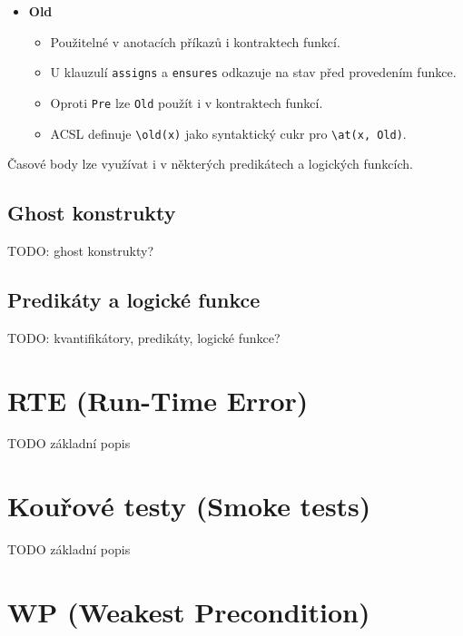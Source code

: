 \begin{itemize}
    \item \textbf{Old}
    \begin{itemize}
        \item Použitelné v anotacích příkazů i kontraktech funkcí.
        \item U klauzulí \texttt{assigns} a \texttt{ensures} odkazuje na stav před provedením funkce.
        \item Oproti \texttt{Pre} lze \texttt{Old} použít i v kontraktech funkcí.
        \item ACSL definuje \texttt{\textbackslash old(x)} jako syntaktický cukr pro \texttt{\textbackslash at(x, Old)}.
    \end{itemize}
\end{itemize}

Časové body lze využívat i v některých predikátech a logických funkcích.

\subsection{Ghost konstrukty}
\label{subsec:acsl-ghost-konstrukty}

TODO: ghost konstrukty?

\subsection{Predikáty a logické funkce}
\label{subsec:acsl-predikaty-a-logicke-funkce}

TODO: kvantifikátory, predikáty, logické funkce?


\section{RTE (Run-Time Error)}
\label{sec:frama-c-rte}

TODO základní popis

\section{Kouřové testy (Smoke tests)}
\label{sec:frama-c-smoke-tests}

TODO základní popis

\section{WP (Weakest Precondition)}
\label{sec:frama-c-wp}

